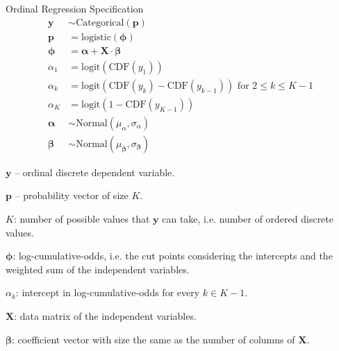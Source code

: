 \begin{frame}{Ordinal Regression Specification}
	\footnotesize
	$$
		\begin{aligned}
			\mathbf{y}          & \sim \text{Categorical}(\mathbf{p})                                                  \\
			\mathbf{p}          & = \text{logistic}(\boldsymbol{\phi})                                                 \\
			\boldsymbol{\phi}   & = \boldsymbol{\alpha} + \mathbf{X} \cdot \boldsymbol{\beta}                          \\
			\alpha_1            & = \text{logit}(\text{CDF}(y_1))                                                      \\
			\alpha_k            & = \text{logit}(\text{CDF}(y_k) - \text{CDF}(y_{k-1})) \text{ for } 2 \leq k \leq K-1 \\
			\alpha_{K}          & = \text{logit}(1 - \text{CDF}(y_{K-1}))                                              \\
			\boldsymbol{\alpha} & \sim \text{Normal}(\mu_\alpha, \sigma_\alpha)                                        \\
			\boldsymbol{\beta}  & \sim \text{Normal}(\mu_{\boldsymbol{\beta}}, \sigma_{\boldsymbol{\beta}})
		\end{aligned}
	$$
	\begin{vfilleditems}
		\footnotesize{
			\item $\mathbf{y}$ -- ordinal discrete dependent variable.
			\item $\mathbf{p}$ -- probability vector of size $K$.
			\item $K$: number of possible values that $\mathbf{y}$ can take, i.e. number of ordered discrete values.
			\item $\boldsymbol{\phi}$: log-cumulative-odds, i.e. the cut points considering the intercepts and the weighted sum of the independent variables.
			\item $\alpha_k$: intercept in log-cumulative-odds for every $k \in K-1$.
			\item $\mathbf{X}$: data matrix of the independent variables.
			\item $\boldsymbol{\beta}$: coefficient vector with size the same as the number of columns of $\mathbf{X}$.
		}
	\end{vfilleditems}
\end{frame}
